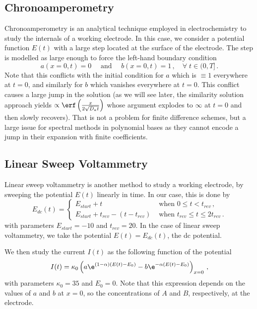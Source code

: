 \documentclass{prettytex/ox/mmsc-special-topic}
\begin{document}
  \subsection{Chronoamperometry}
  Chronoamperometry is an analytical technique employed in electrochemistry to study the internals of a working electrode. In this case, we consider a potential function $E(t)$ with a large step located at the surface of the electrode.
  The step is modelled as large enough to force the left-hand boundary condition
  \begin{equation}
    a(x=0, t) = 0 \quad\text{ and }\quad b(x=0, t) = 1\,,\quad \forall\; t \in (0, T]\,.
    \label{eq:chrono-bc}
  \end{equation}
  Note that this conflicts with the initial condition for $a$ which is $\equiv 1$ everywhere at $t = 0$, and similarly for $b$ which vanishes everywhere at $t = 0$.
  This conflict causes a large jump in the solution (as we will see later, the similarity solution approach yields $\propto \erf\left(\frac{x}{2 \sqrt{D_a t}}\right)$ whose argument explodes to $\infty$ at $t = 0$ and then slowly recovers).
  That is not a problem for finite difference schemes, but a large issue for spectral methods in polynomial bases as they cannot encode a jump in their expansion with finite coefficients.

  \subsection{Linear Sweep Voltammetry}
  Linear sweep voltammetry is another method to study a working electrode, by sweeping the potential $E(t)$ linearly in time. In our case, this is done by
  \begin{equation}
    E_{dc}(t) = \begin{cases}
      E_{start} + t                     & \text{ when } 0 \leq t< t_{rev}\,,           \\
      E_{start} + t_{rev} - (t-t_{rev}) & \text{ when } t_{rev} \leq t\leq 2t_{rev}\,.
    \end{cases}
    \label{eq:linear-potential}
  \end{equation}
  with parameters $E_{start} = -10$ and $t_{rev} = 20$.
  In the case of linear sweep voltammetry, we take the potential $E(t) = E_{dc}(t)$, the \gls{dc} potential.

  We then study the current $I(t)$ as the following function of the potential
  \begin{equation}
    I(t) = \kappa_0 \left(a \e^{(1-\alpha) (E(t) - E_0)} - b \e^{-\alpha (E(t) - E_0)}\right)_{x=0}\,,
    \label{eq:current}
  \end{equation}
  with parameters $\kappa_0 = 35$ and $E_0 = 0$.
  Note that this expression depends on the values of $a$ and $b$ at $x = 0$, so the concentrations of $A$ and $B$, respectively, at the electrode.
\end{document}
